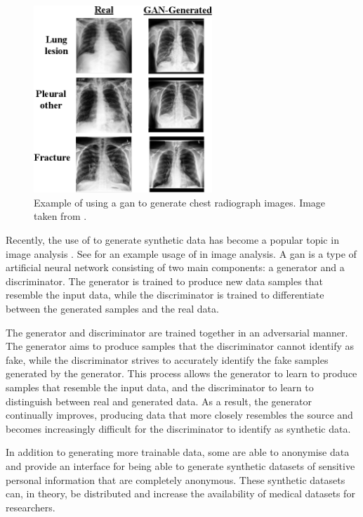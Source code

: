 \documentclass[12pt, letterpaper]{article}
\begin{document}
\begin{figure}[t]
    \centering
    \includegraphics[width=0.6\textwidth]{figures/gan-xray.png}
    \caption{Example of using a \acrfull{gan} to generate chest radiograph images. Image taken from \cite{sundaram_gan-based_2021}.}
    \label{fig:gan-xray}
\end{figure}

Recently, the use of  to generate synthetic data has become a popular topic in image analysis \cite{pavan_kumar_generative_2021}. See  for an example usage of  in image analysis. A \acrshort{gan} is a type of artificial neural network consisting of two main components: a generator and a discriminator. The generator is trained to produce new data samples that resemble the input data, while the discriminator is trained to differentiate between the generated samples and the real data.

The generator and discriminator are trained together in an adversarial manner. The generator aims to produce samples that the discriminator cannot identify as fake, while the discriminator strives to accurately identify the fake samples generated by the generator. This process allows the generator to learn to produce samples that resemble the input data, and the discriminator to learn to distinguish between real and generated data. As a result, the generator continually improves, producing data that more closely resembles the source and becomes increasingly difficult for the discriminator to identify as synthetic data.

In addition to generating more trainable data, some  are able to anonymise data \cite{liu_ppgan_2019} and provide an interface for being able to generate synthetic datasets of sensitive personal information that are completely anonymous. These synthetic datasets can, in theory, be distributed and increase the availability of medical datasets for researchers.
\end{document}
